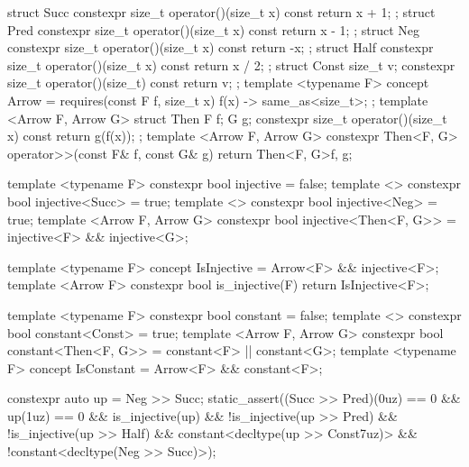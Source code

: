 \begin{listing}[htbp]
\begin{minipage}[t]{0.48\linewidth}
\begin{cpp}
struct Succ { constexpr size_t
  operator()(size_t x) const { return x + 1; } };
struct Pred { constexpr size_t
  operator()(size_t x) const { return x - 1; } };
struct Neg { constexpr size_t
  operator()(size_t x) const { return -x; } };
struct Half { constexpr size_t
  operator()(size_t x) const { return x / 2; } };
struct Const { size_t v; constexpr size_t
  operator()(size_t) const { return v; } };
template <typename F>
concept Arrow = requires(const F f, size_t x) {
  { f(x) } -> same_as<size_t>; };
template <Arrow F, Arrow G>
struct Then { F f; G g; constexpr size_t
  operator()(size_t x) const { return g(f(x)); } };
template <Arrow F, Arrow G>
constexpr Then<F, G> operator>>(const F& f,
                                const G& g)
  { return Then<F, G>{f, g}; }
\end{cpp}
\end{minipage}\hfill
\begin{minipage}[t]{0.48\linewidth}
\begin{cpp}
template <typename F>
constexpr bool injective = false;
template <>
constexpr bool injective<Succ> = true;
template <>
constexpr bool injective<Neg> = true;
template <Arrow F, Arrow G>
constexpr bool injective<Then<F, G>> =
    injective<F> && injective<G>;

template <typename F>
concept IsInjective =
    Arrow<F> && injective<F>;
template <Arrow F>
constexpr bool is_injective(F)
  { return IsInjective<F>; }

template <typename F>
constexpr bool constant = false;
template <>
constexpr bool constant<Const> = true;
template <Arrow F, Arrow G>
constexpr bool constant<Then<F, G>> =
    constant<F> || constant<G>;
template <typename F>
concept IsConstant = Arrow<F> && constant<F>;
\end{cpp}
\end{minipage}
\vspace{-6pt}
\begin{cpp}
constexpr auto up = Neg{} >> Succ{};
static_assert((Succ{} >> Pred{})(0uz) == 0 && up(1uz) == 0 &&
              is_injective(up) && !is_injective(up >> Pred{}) && !is_injective(up >> Half{}) &&
              constant<decltype(up >> Const{7uz})> && !constant<decltype(Neg{} >> Succ{})>);
\end{cpp}
\caption{\hyperref[def:rule1]{Rule~1}: Substitution.
Left: arrows on  as values, a constant one among them, and their composite.
Right: two laws as traits, each with its default, its axioms and a lemma for a composite, and the shapes through which they are read.
The constrained parameters are sugar (Appendix~\ref{app:fjlt:closure}).}
\label{lst:rule1}
\end{listing}


